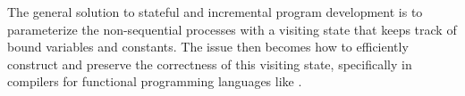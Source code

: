 The general solution to stateful and incremental program development is to parameterize the non-sequential processes with a visiting state that keeps track of bound variables and constants.
The issue then becomes how to efficiently construct and preserve the correctness of this visiting state, specifically in compilers for functional programming languages like \Beluga.

